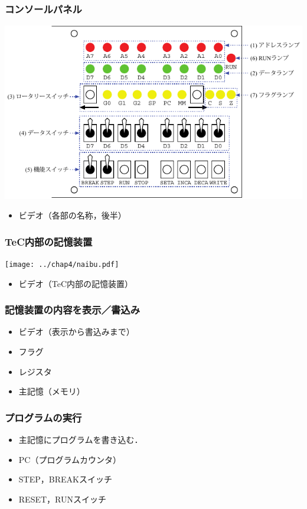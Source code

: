 \documentclass[handout]{beamer}         %
\begin{document}
\begin{frame}
  \frametitle{コンソールパネル}
  \vfill
  \centerline{\includegraphics[scale=1.0]{../chap4/console.pdf}}
  \vfill
  \begin{itemize}
    \item ビデオ（各部の名称，後半）
  \end{itemize}
  \vfill
\end{frame}

\begin{frame}
  \frametitle{TeC内部の記憶装置}
  \vfill
  \centerline{\texttt{[image: ../chap4/naibu.pdf]}}
  \vfill
  \begin{itemize}
    \item ビデオ（TeC内部の記憶装置）
  \end{itemize}
  \vfill
\end{frame}

\begin{frame}
  \frametitle{記憶装置の内容を表示／書込み}
  \begin{itemize}
    \item ビデオ（表示から書込みまで）
    \item フラグ
    \item レジスタ
    \item 主記憶（メモリ）
  \end{itemize}
  \vfill
  \vfill
  \vfill
\end{frame}

\begin{frame}
  \frametitle{プログラムの実行}
  \begin{itemize}
    \item 主記憶にプログラムを書き込む．
    \item PC（プログラムカウンタ）
    \item STEP，BREAKスイッチ
    \item RESET，RUNスイッチ
  \end{itemize}
  \vfill
  \vfill
  \vfill
\end{frame}
\end{document}
